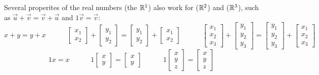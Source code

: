 
\begin{applicationActivities}


\begin{observation}
  Several properites of the real numbers (the
   \(\mathbb{R}^1\)) also work for
   (\(\mathbb{R}^2\)) and
   (\(\mathbb{R}^3\)),
  such as \(\vec u+\vec v=\vec v+\vec u\) and \(1\vec{v}=\vec{v}\):
  \[
    x+y=y+x
      \hspace{3em}
    \begin{bmatrix}x_1\\x_2\end{bmatrix}+\begin{bmatrix}y_1\\y_2\end{bmatrix}
      =
    \begin{bmatrix}y_1\\y_2\end{bmatrix}+\begin{bmatrix}x_1\\x_2\end{bmatrix}
      \hspace{3em}
    \begin{bmatrix}x_1\\x_2\\x_3\end{bmatrix}
      +
    \begin{bmatrix}y_1\\y_2\\y_3\end{bmatrix}
      =
    \begin{bmatrix}y_1\\y_2\\y_3\end{bmatrix}
      +
    \begin{bmatrix}x_1\\x_2\\x_3\end{bmatrix}
  \]
  \[
    1x=x
      \hspace{3em}
    1\begin{bmatrix}x\\y\end{bmatrix}=\begin{bmatrix}x\\y\end{bmatrix}
      \hspace{3em}
    1\begin{bmatrix}x\\y\\z\end{bmatrix}=\begin{bmatrix}x\\y\\z\end{bmatrix}
  \]
\end{observation}


\end{applicationActivities}
